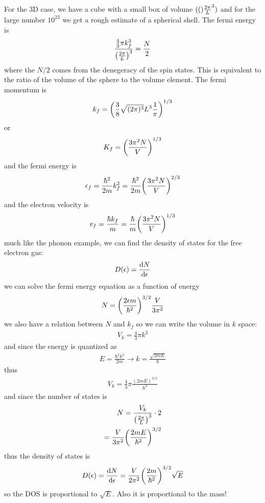 \documentclass[../main.tex]{subfiles}
\begin{document}
For the 3D case, we have a cube with a small box of volume $(\qt\frac{2\pi}{L}^3)$ and for the
large number $10^{23}$ we get a rough estimate of a spherical shell. The fermi energy is
\begin{align*}
    \frac{\frac{4}{3} \pi k_f^3}{\qt(\frac{2\pi}{L})^3} = \frac{N}{2}
\end{align*}
where the $N/2$ comes from the denegeracy of the spin states. This is equivalent to the ratio of the
volume of the sphere to the volume element. The fermi momentum is
\begin{align*}
    k_f = \qt(\frac{3}{8} \sqrt{(2\pi)^3}{L^3} \frac{1}{\pi})^{1/3}
\end{align*}
or 
\begin{align*}
    K_f = \qt(\frac{3\pi^2N}{V})^{1/3}
\end{align*}
and the fermi energy is
\begin{align*}
    \epsilon_f = \frac{\hbar^2}{2m} k_f^2 
    = \frac{\hbar^2}{2m} \qt(\frac{3\pi^2N}{V})^{2/3}
\end{align*}
and the electron velocity is
\begin{align*}
    v_f = \frac{\hbar k_f}{m} = \frac{\hbar}{m} \qt(\frac{3\pi^2N}{V})^{1/3}
\end{align*}
much like the phonon example, we can find the density of states for the free electron gas:
\begin{align*}
    D(\epsilon) = \dv{N}{\epsilon}
\end{align*}
we can solve the fermi energy equation as a function of energy
\begin{align*}
    N = \qt(\frac{2\epsilon m}{\hbar^2})^{3/2} \frac{V}{3\pi^2}
\end{align*}
we also have a relation between $N$ and $k_f$ so we can write the volume in $k$ space:
\begin{align*}
    V_k = \frac{4}{3} \pi k^3
\end{align*}
and since the energy is quantized as
\begin{align*}
    E = \frac{\hbar^2 k^2}{2m} \to k = \frac{\sqrt{2mE}}{\hbar}
\end{align*}
thus
\begin{align*}
    V_k = \frac{4}{3} \pi \frac{(2mE)^{3/2}}{\hbar^3}
\end{align*}
and since the number of states is
\begin{align*}
    N = \frac{V_k}{\qt(\frac{2\pi}{L})^3} \cdot 2 \\
    = \frac{V}{3\pi^2} \qt(\frac{2mE}{\hbar^2})^{3/2}
\end{align*}
thus the density of states is
\begin{align*}
    D(\epsilon) = \dv{N}{\epsilon} = \frac{V}{2\pi^2} \qt(\frac{2m}{\hbar^2})^{3/2} \sqrt{E}
\end{align*}
so the DOS is proportional to $\sqrt{E}$. Also it is proportional to the mass!
\end{document}
